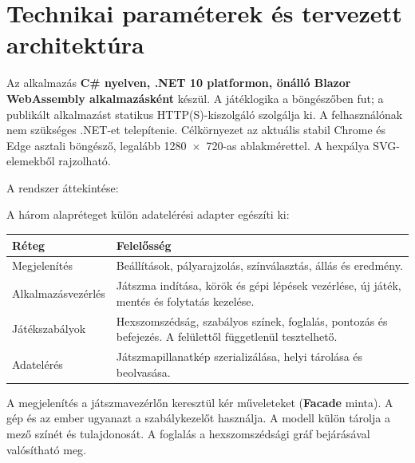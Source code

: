 \documentclass[11pt,a4paper]{article}
\begin{document}
\section{Technikai paraméterek és tervezett architektúra}
Az alkalmazás \textbf{C\# nyelven, .NET 10 platformon, önálló Blazor
WebAssembly alkalmazásként} készül. A játéklogika a böngészőben fut;
a publikált alkalmazást statikus HTTP(S)-kiszolgáló szolgálja ki.
A felhasználónak nem szükséges .NET-et telepítenie. Célkörnyezet az
aktuális stabil Chrome és Edge asztali böngésző, legalább
1280~$\times$~720-as ablakmérettel. A hexpálya SVG-elemekből rajzolható.

A rendszer áttekintése:
\begin{center}
\end{center}
A három alapréteget külön adatelérési adapter egészíti ki:

\begin{tabularx}{\linewidth}{@{}lY@{}}
\toprule
Réteg & Felelősség \\
\midrule
Megjelenítés & Beállítások, pályarajzolás, színválasztás, állás és eredmény. \\
Alkalmazásvezérlés & Játszma indítása, körök és gépi lépések vezérlése,
új játék, mentés és folytatás kezelése. \\
Játékszabályok & Hexszomszédság, szabályos színek, foglalás, pontozás
és befejezés. A felülettől függetlenül tesztelhető. \\
Adatelérés & Játszmapillanatkép szerializálása, helyi tárolása és beolvasása. \\
\bottomrule
\end{tabularx}

A megjelenítés a játszmavezérlőn keresztül kér műveleteket
(\textbf{Facade} minta). A gép és az ember ugyanazt a szabálykezelőt
használja. A modell külön tárolja a mező színét és tulajdonosát.
A foglalás a hexszomszédsági gráf bejárásával valósítható meg.
\end{document}
